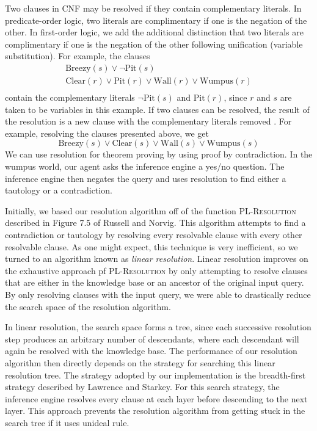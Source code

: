 \documentclass{article}
\begin{document}
Two clauses in CNF may be resolved if they contain complementary literals. In predicate-order logic, two literals are complimentary if one is the negation of the other. 
In first-order logic, we add the additional distinction that two literals are complimentary if one is the negation of the other following unification (variable substitution)\cite{ai}. 
For example, the clauses
\begin{gather*}
\text{Breezy}(s) \lor \neg \text{Pit}(s) \\
\text{Clear}(r) \lor \text{Pit}(r) \lor \text{Wall}(r) \lor \text{Wumpus}(r) \\
\end{gather*}
contain the complementary literals $\neg \text{Pit}(s)$ and $\text{Pit}(r)$, since $r$ and $s$ are taken to be variables in this example. 
If two clauses can be resolved, the result of the resolution is a new clause with the complementary literals removed \cite{ai}. 
For example, resolving the clauses presented above, we get
\begin{equation*}
\text{Breezy}(s) \lor \text{Clear}(s) \lor \text{Wall}(s) \lor \text{Wumpus}(s)
\end{equation*}
We can use resolution for theorem proving by using proof by contradiction. 
In the wumpus world, our agent asks the inference engine a yes/no question.
The inference engine then negates the query and uses resolution to find either a tautology or a contradiction.

Initially, we based our resolution algorithm off of the function \textsc{PL-Resolution} described in Figure 7.5 of Russell and Norvig. 
This algorithm attempts to find a contradiction or tautology by resolving every resolvable clause with every other resolvable clause. 
As one might expect, this technique is very inefficient, so we turned to an algorithm known as \textit{linear resolution}\cite{linear}. 
Linear resolution improves on the exhaustive approach pf \textsc{PL-Resolution} by only attempting to resolve clauses that are either in the knowledge base or an ancestor of the original input query\cite{ai}. 
By only resolving clauses with the input query, we were able to drastically reduce the search space of the resolution algorithm.

In linear resolution, the search space forms a tree, since each successive resolution step produces an arbitrary number of descendants, where each descendant will again be resolved with the knowledge base. 
The performance of our resolution algorithm then directly depends on the strategy for searching this linear resolution tree. 
The strategy adopted by our implementation is the breadth-first strategy described by Lawrence and Starkey. 
For this search strategy, the inference engine resolves every clause at each layer before descending to the next layer. 
This approach prevents the resolution algorithm from getting stuck in the search tree if it uses unideal rule.
\end{document}

